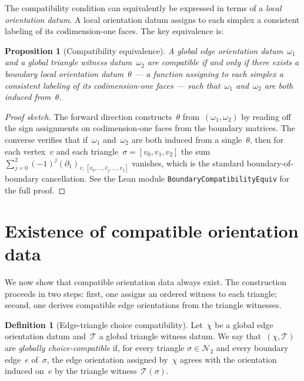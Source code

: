 \documentclass[11pt,a4paper]{article}
\theoremstyle{plain}
\newtheorem{proposition}[theorem]{Proposition}
\theoremstyle{definition}
\newtheorem{definition}[theorem]{Definition}
\theoremstyle{remark}
\newcommand{\cN}{\mathcal{N}}
\newcommand{\cT}{\mathcal{T}}
\begin{document}
The compatibility condition can equivalently be expressed in terms of a
\emph{local orientation datum}. A local orientation datum assigns to each
simplex a consistent labeling of its codimension-one faces. The key
equivalence is:

\begin{proposition}[Compatibility equivalence]
\label{prop:compat-equiv}
A global edge orientation datum~$\omega_1$ and a global triangle witness
datum~$\omega_2$ are compatible if and only if there exists a
\emph{boundary local orientation datum}~$\theta$ --- a function assigning
to each simplex a consistent labeling of its codimension-one faces ---
such that~$\omega_1$ and~$\omega_2$ are both induced from~$\theta$.
\end{proposition}

\begin{proof}[Proof sketch]
The forward direction constructs~$\theta$ from~$(\omega_1, \omega_2)$ by
reading off the sign assignments on codimension-one faces from the
boundary matrices. The converse verifies that if~$\omega_1$ and~$\omega_2$
are both induced from a single~$\theta$, then for each vertex~$v$
and each triangle~$\sigma = [v_0, v_1, v_2]$ the sum
$\sum_{j=0}^{2} (-1)^j (\partial_1)_{v,\, [v_0, \ldots, \hat{v}_j,
\ldots, v_2]}$ vanishes, which is the standard boundary-of-boundary
cancellation.
See the Lean module \texttt{BoundaryCompatibilityEquiv} for the full proof.
\end{proof}

\section{Existence of compatible orientation data}
\label{sec:existence}

We now show that compatible orientation data always exist. The construction
proceeds in two steps: first, one assigns an ordered witness to each
triangle; second, one derives compatible edge orientations from the
triangle witnesses.

\begin{definition}[Edge-triangle choice compatibility]
\label{def:edge-triangle-compat}
Let~$\chi$ be a global edge orientation datum and~$\cT$ a global
triangle witness datum. We say that~$(\chi, \cT)$ are
\emph{globally choice-compatible} if, for every triangle
$\sigma \in \cN_2$ and every boundary edge~$e$ of~$\sigma$, the
edge orientation assigned by~$\chi$ agrees with the orientation
induced on~$e$ by the triangle witness~$\cT(\sigma)$.
\end{definition}
\end{document}
